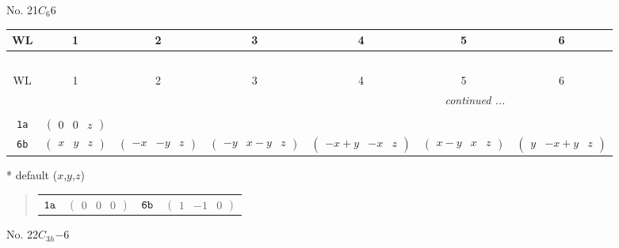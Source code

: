 \documentclass[fleqn,9pt,landscape]{jsarticle}
\begin{document}
\newpage
No. 21\quad$C_{6}$\quad$6$\quad[ hexagonal ]
\begin{center}
\renewcommand{\arraystretch}{1.2}
\begin{longtable}{ccccccc}
 \hline \hline
WL & 1 & 2 & 3 & 4 & 5 & 6 \\ \hline \endfirsthead

\multicolumn{6}{l}{\tablename\ \thetable{}} \\
 \hline \hline
WL & 1 & 2 & 3 & 4 & 5 & 6 \\ \hline \endhead

 \hline \hline
\multicolumn{6}{r}{\footnotesize\it continued ...} \\ \endfoot

 \hline \hline
\multicolumn{6}{r}{} \\ \endlastfoot

{\tt 1a} & $ \begin{pmatrix} 0 & 0 & z \end{pmatrix} $ & $  $ & $  $ & $  $ & $  $ & $  $ \\ \hline
{\tt 6b} & $ \begin{pmatrix} x & y & z \end{pmatrix} $ & $ \begin{pmatrix} - x & - y & z \end{pmatrix} $ & $ \begin{pmatrix} - y & x - y & z \end{pmatrix} $ & $ \begin{pmatrix} - x + y & - x & z \end{pmatrix} $ & $ \begin{pmatrix} x - y & x & z \end{pmatrix} $ & $ \begin{pmatrix} y & - x + y & z \end{pmatrix} $ \\
\end{longtable}
\end{center}
* default ($x$,$y$,$z$)
\begin{quote}
\begin{tabular}{cccc}
$ {\tt 1a} $ & $ \begin{pmatrix} 0 & 0 & 0 \end{pmatrix} $ & $ {\tt 6b} $ & $ \begin{pmatrix} 1 & -1 & 0 \end{pmatrix} $
\end{tabular}
\end{quote}
\newpage
No. 22\quad$C_{3h}$\quad$-6$\quad[ hexagonal ]
\end{document}
